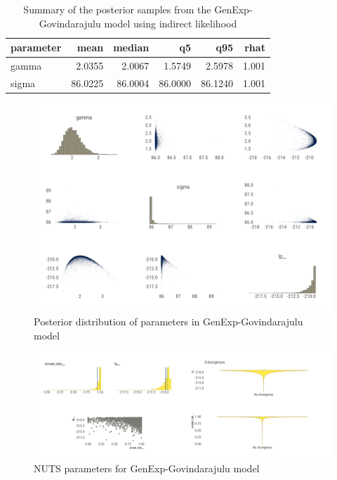 \documentclass[
  12pt,
]{article}
\begin{document}
\begin{table}[!h]

\caption{\label{tab:govi-tab}Summary of the posterior samples from the GenExp-Govindarajulu model using indirect likelihood}
\centering
\begin{tabular}[t]{lrrrrr}
\toprule
parameter & mean & median & q5 & q95 & rhat\\
\midrule
gamma & 2.0355 & 2.0067 & 1.5749 & 2.5978 & 1.001\\
sigma & 86.0225 & 86.0004 & 86.0000 & 86.1240 & 1.001\\
\bottomrule
\end{tabular}
\end{table}

\begin{figure}

{\centering \includegraphics[width=0.8\linewidth]{ilbm_article_files/figure-latex/govi-pairs-graph-1} 

}

\caption{Posterior distribution of parameters in GenExp-Govindarajulu model}\label{fig:govi-pairs-graph}
\end{figure}

\begin{figure}

{\centering \includegraphics[width=1\linewidth]{ilbm_article_files/figure-latex/govi-nuts-graph-1} 

}

\caption{NUTS parameters for GenExp-Govindarajulu model}\label{fig:govi-nuts-graph}
\end{figure}
\end{document}
